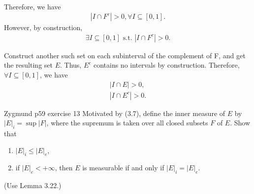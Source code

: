\documentclass[UTF8,a4paper,10pt]{article}
\begin{document}
\begin{solution}\,

Therefore, we have
\begin{equation*}
  \begin{aligned}
    |I\cap F^c| > 0,  \forall I\subseteq[0,1] .
  \end{aligned}
\end{equation*}
However, by construction,
\begin{equation*}
  \begin{aligned}
    \exists I\subseteq[0,1]\text{ s.t. }|I\cap F^c| > 0.
  \end{aligned}
\end{equation*}

Construct another such set on each subinterval of the complement of F, and get the resulting set \(E\). Thus, \(E^c\) contains no intervals by construction. Therefore, \(\forall I\subseteq[0,1]\), we have
\begin{equation*}
  \begin{aligned}
    |I\cap E| > 0,\\
    |I\cap E^c| > 0.
  \end{aligned}
\end{equation*}

\end{solution}


\pagebreak
\begin{Problem}[]{Zygmund p59 exercise 13}
  Motivated by (3.7), define the inner measure of $E$ by $|E|_i = \sup |F|$, where
  the supremum is taken over all closed subsets $F$ of $E$. Show that
  \begin{enumerate}
    \item $|E|_i \leq |E|_e$,
    \item if $|E|_e < +\infty$, then $E$ is measurable if and only if $|E|_i = |E|_e$.
  \end{enumerate}
  (Use Lemma 3.22.)

\end{Problem}
\end{document}
